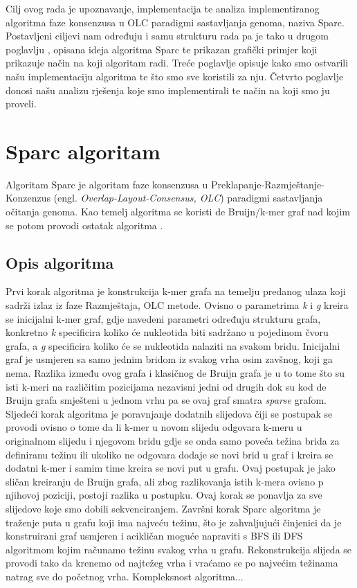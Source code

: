 \documentclass[times, utf8, seminar, numeric]{fer}
\begin{document}
Cilj ovog rada je upoznavanje, implementacija te analiza implementiranog algoritma faze konsenzusa u OLC paradigmi sastavljanja genoma, naziva Sparc. Postavljeni ciljevi nam određuju i samu strukturu rada pa je tako u drugom poglavlju , opisana ideja algoritma Sparc te prikazan grafički primjer koji prikazuje način na koji algoritam radi. Treće poglavlje opisuje kako smo ostvarili našu implementaciju algoritma te što smo sve koristili za nju. Četvrto poglavlje donosi našu analizu rješenja koje smo implementirali te način na koji smo ju proveli.


\chapter{Sparc algoritam}
Algoritam Sparc je algoritam faze konsenzusa u Preklapanje-Razmještanje-Konzenzus (engl. \emph{Overlap-Layout-Consensus, OLC}) paradigmi sastavljanja očitanja genoma. Kao temelj algoritma se koristi de Bruijn/k-mer graf nad kojim se potom provodi ostatak algoritma \cite{Ye2016}.
\section{Opis algoritma}
Prvi korak algoritma je konstrukcija k-mer grafa na temelju predanog ulaza koji sadrži izlaz iz faze Razmještaja, OLC metode. Ovisno o parametrima \emph{k} i \emph{g} kreira se inicijalni k-mer graf, gdje navedeni parametri određuju strukturu grafa, konkretno \emph{k} specificira koliko će nukleotida biti sadržano u pojedinom čvoru grafa, a \emph{g} specificira koliko će se nukleotida nalaziti na svakom bridu. Inicijalni graf je usmjeren sa samo jednim bridom iz svakog vrha osim zavšnog, koji ga nema. Razlika između ovog grafa i klasičnog de Bruijn grafa je u to tome što su isti k-meri na različitim pozicijama nezavisni jedni od drugih dok su kod de Bruijn grafa smješteni u jednom vrhu pa se ovaj graf smatra \emph {sparse} grafom. Sljedeći korak algoritma je poravnjanje dodatnih slijedova čiji se postupak se provodi ovisno o tome da li k-mer u novom slijedu odgovara k-meru u originalnom slijedu i njegovom bridu gdje se onda samo poveća težina brida za definiranu težinu ili ukoliko ne odgovara dodaje se novi brid u graf i kreira se dodatni k-mer i samim time kreira se novi put u grafu. Ovaj postupak je jako sličan kreiranju de Bruijn grafa, ali zbog razlikovanja istih k-mera ovisno p njihovoj poziciji, postoji razlika u postupku. Ovaj korak se ponavlja za sve slijedove koje smo dobili sekvenciranjem. Završni korak Sparc algoritma je traženje puta u grafu koji ima najveću težinu, što je zahvaljujući činjenici da je konstruirani graf usmjeren i acikličan moguće napraviti s BFS ili DFS algoritmom kojim računamo težinu svakog vrha u grafu. Rekonstrukcija slijeda se provodi tako da krenemo od najtežeg vrha i vraćamo se po najvećim težinama natrag sve do početnog vrha. Kompleksnost algoritma...
\end{document}
